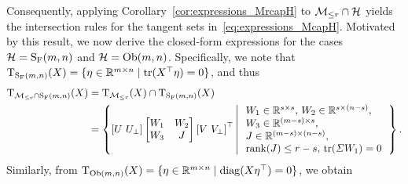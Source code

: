 Consequently, applying Corollary~\ref{cor:expressions_MrcapH} to $\mathcal{M}_{\le r} \cap \mathcal{H}$ yields the intersection rules for the tangent sets in~\eqref{eq:expressions_McapH}. Motivated by this result, we now derive the closed-form expressions for the cases $\mathcal{H} = \mathrm{S_F}(m,n)$ and $\mathcal{H} = \mathrm{Ob}(m,n)$. Specifically, we note that $\mathrm{T}_{\mathrm{S_F}(m,n)}(X)=\{\eta\in\mathbb{R}^{m\times n}\mid\mathrm{tr}(X^\top \eta)=0\}$, and thus
\begin{equation*}
\begin{aligned}
\mathrm{T}_{\mathcal{M}_{\le r}\cap\mathrm{S_F}(m,n)}(X)&= \mathrm{T}_{\mathcal{M}_{\le r}}(X)\cap\mathrm{T}_{\mathrm{S_F}(m,n)}(X)
\\
&=\left\{ {\left[ U\,\,U_{\bot} \right] \left[ \begin{matrix}
W_1 &		W_2\\
W_3&		J\\
\end{matrix} \right] \left[ V\,\,V_{\bot} \right] ^{\top}\left|\,\begin{array}{l}
W_1\in\mathbb{R}^{s\times s},\, W_2\in\mathbb{R} ^{s\times \left( n-s \right)},
\\
W_3\in\mathbb{R} ^{\left( m-s \right) \times s},
\\
J\in \mathbb{R}^{\left( m-s \right) \times \left( n-s \right)},
\\
\operatorname{rank}(J)\le r-s,\, \mathrm{tr}(\varSigma W_1) = 0
\end{array}
\right.} \right\}. 
\end{aligned}
\end{equation*}
Similarly, from $\mathrm{T}_{\mathrm{Ob}(m,n)}(X)=\{\eta\in\mathbb{R}^{m\times n}\mid\operatorname{diag}(X\eta^\top)=0\}$, we obtain
